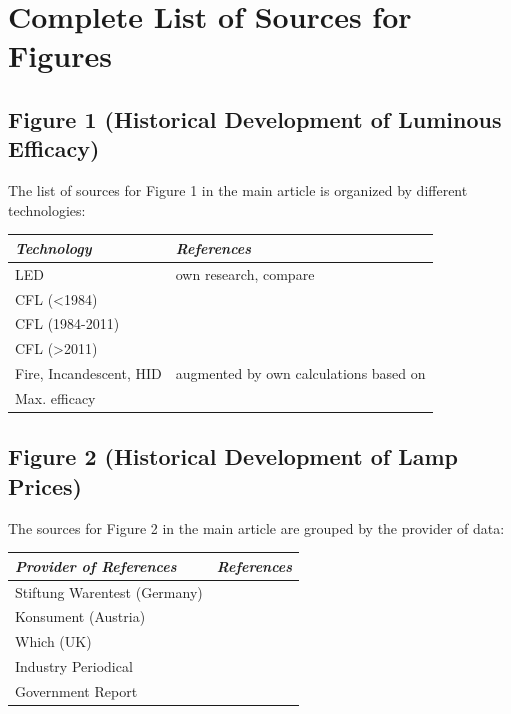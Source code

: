 \documentclass[10pt]{article}
\begin{document}
\clearpage
\section{Complete List of Sources for Figures}
\label{sec:sources}

\subsection{Figure 1 (Historical Development of Luminous Efficacy)}

The list of sources for Figure 1 in the main article is organized by different technologies:

\begin{table}[h!]
    \begin{tabularx}{\textwidth}{|l|X|}
    \hline
    \textit{Technology} & \textit{References} \\
    \hline
    LED & own research, compare \cite{zenodo_weinold_led_history} \\
    \hline
    CFL (<1984) & \cite{Bouwknegt1982}\cite{Vrenken1983} \\
    \hline
    CFL (1984-2011) & \cite{eger2018origin} \\
    \hline
    CFL (>2011) & \cite{Guan2015} \\
    \hline
    Fire, Incandescent, HID & \cite{azevedo2009transition} augmented by own calculations based on \cite{benesch1905beleuchtungswesen} \\
    \hline
    Max. efficacy & \cite{Murphy2012} \\
    \hline
    \end{tabularx}
\end{table}

\subsection{Figure 2 (Historical Development of Lamp Prices)}

The sources for Figure 2 in the main article are grouped by the provider of data:

\begin{table}[h!]
    \begin{tabularx}{\textwidth}{|l|X|}
    \hline
    \textit{Provider of References} & \textit{References} \\
    \hline
    Stiftung Warentest (Germany) & \cite{Warentest2008}\cite{Warentest2009_1}\cite{Warentest2009_2}\cite{Warentest2010_1}\cite{Warentest2010_2}\cite{Warentest2011}\cite{Warentest2012}\cite{Warentest2013}\cite{Warentest2014_1}\cite{Warentest2014_2}\cite{Warentest2015}\cite{Warentest2016_1}\cite{Warentest2016_2}\cite{Warentest2018} \\
    \hline
    Konsument (Austria) & \cite{Konsument2010} \\
    \hline
    Which (UK) & \cite{Which2020} \\
    \hline
    Industry Periodical & \cite{PM2020} \\
    \hline
    Government Report & \cite{council2013assessment} \\
    \hline
    \end{tabularx}
\end{table}
\end{document}
